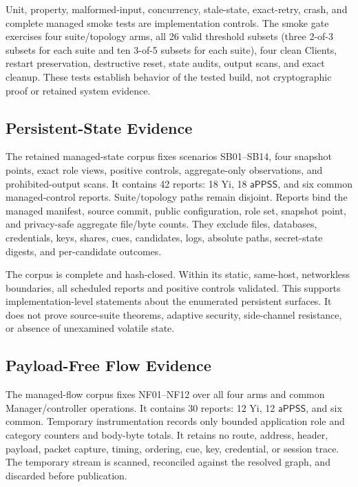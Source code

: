 \documentclass[sigconf,anonymous]{acmart}
\newcommand{\APPSS}{\ensuremath{\mathsf{aPPSS}}}
\begin{document}
Unit, property, malformed-input, concurrency, stale-state, exact-retry, crash,
and complete managed smoke tests are implementation controls. The smoke gate
exercises four suite/topology arms, all 26 valid threshold subsets (three
2-of-3 subsets for each suite and ten 3-of-5 subsets for each suite), four
clean Clients, restart preservation, destructive reset, state audits, output
scans, and exact cleanup. These tests establish behavior of the tested build,
not cryptographic proof or retained system evidence.

\subsection{Persistent-State Evidence}

The retained managed-state corpus fixes scenarios SB01--SB14, four snapshot
points, exact role views, positive controls, aggregate-only observations, and
prohibited-output scans. It contains 42 reports: 18 Yi, 18 \APPSS, and six
common managed-control reports. Suite/topology paths remain disjoint. Reports
bind the managed manifest, source commit, public configuration, role set,
snapshot point, and privacy-safe aggregate file/byte counts. They exclude
files, databases, credentials, keys, shares, cues, candidates, logs, absolute
paths, secret-state digests, and per-candidate outcomes.

The corpus is complete and hash-closed. Within its static, same-host,
networkless boundaries, all scheduled reports and positive controls validated.
This supports implementation-level statements about the enumerated persistent
surfaces. It does not prove source-suite theorems, adaptive security,
side-channel resistance, or absence of unexamined volatile state.

\subsection{Payload-Free Flow Evidence}

The managed-flow corpus fixes NF01--NF12 over all four arms and common
Manager/controller operations. It contains 30 reports: 12 Yi, 12 \APPSS, and
six common. Temporary instrumentation records only bounded application role
and category counters and body-byte totals. It retains no route, address,
header, payload, packet capture, timing, ordering, cue, key, credential, or
session trace. The temporary stream is scanned, reconciled against the
resolved graph, and discarded before publication.
\end{document}
